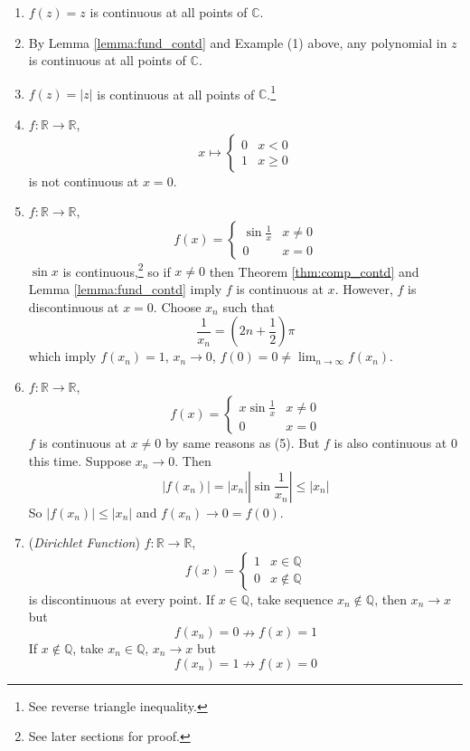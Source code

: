 \documentclass[10pt, a4paper, twoside]{report}
\begin{document}
\begin{enumerate}
    \item \(f(z)=z\) is continuous at all points of \(\mathbb{C}\).
    \item By Lemma \ref{lemma:fund_contd} and Example (1) above, any polynomial in \(z\) is continuous at all points of \(\mathbb{C}\).
    \item \(f(z)=|z|\) is continuous at all points of \(\mathbb{C}\).\footnote{See reverse triangle inequality.}
    \item \(f:\mathbb{R}\to\mathbb{R}\),
    \[x\mapsto\begin{cases}
        0 & x<0 \\
        1 & x\geq 0
    \end{cases}\]
    is not continuous at \(x=0\).
    \item \(f:\mathbb{R}\to\mathbb{R}\),
    \[f(x)=\begin{cases}
        \sin\frac 1x & x\neq 0 \\
        0 & x=0
    \end{cases}\]
    \(\sin x\) is continuous,\footnote{See later sections for proof.} so if \(x\neq 0\) then Theorem \ref{thm:comp_contd} and Lemma \ref{lemma:fund_contd} imply \(f\) is continuous at \(x\). However, \(f\) is discontinuous at \(x=0\). Choose \(x_n\) such that
    \[\frac 1{x_n}=\left(2n+\frac 12\right)\pi\]
    which imply \(f(x_n)=1\), \(x_n\to 0\), \(f(0)=0\neq\lim_{n\to\infty}f(x_n)\).
    \item \(f:\mathbb{R}\to\mathbb{R}\),
    \[f(x)=\begin{cases}
        x\sin\frac 1x & x\neq 0 \\
        0 & x=0
    \end{cases}\]
    \(f\) is continuous at \(x\neq 0\) by same reasons as (5). But \(f\) is also continuous at \(0\) this time. Suppose \(x_n\to 0\). Then
    \[|f(x_n)|=|x_n|\left|\sin\frac 1{x_n}\right|\leq|x_n|\]
    So \(|f(x_n)|\leq|x_n|\) and \(f(x_n)\to 0=f(0)\).
    \item (\emph{Dirichlet Function})  \(f:\mathbb{R}\to\mathbb{R}\),
    \[f(x)=\begin{cases}
        1 & x\in\mathbb{Q} \\
        0 & x\notin\mathbb{Q}
    \end{cases}\]
    is discontinuous at every point. If \(x\in\mathbb{Q}\), take sequence \(x_n\notin\mathbb{Q}\), then \(x_n\to x\) but 
    \[f(x_n)=0\nrightarrow f(x)=1\]
    If \(x\notin\mathbb{Q}\), take \(x_n\in\mathbb{Q}\), \(x_n\to x\) but
    \[f(x_n)=1\nrightarrow f(x)=0\]
\end{enumerate}
\end{document}
